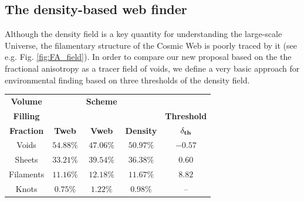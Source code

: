 \documentclass[a4,useAMS,usenatbib,usegraphicx]{latex/mn2e}
\begin{document}
\subsection{The density-based web finder}
\label{subsec:Vweb}


Although the density field is a key quantity for understanding the 
large-scale Universe, the filamentary structure of the Cosmic Web is 
poorly traced by it (see e.g. Fig. \ref{fig:FA_field}). In order to 
compare our new proposal based on the the fractional anisotropy as a 
tracer field of voids, we define a very basic approach for environmental 
finding based on three thresholds of the density field. 


\begin{table}[h]
\begin{flushleft}
\begin{center}
  \begin{tabular}{c  c  c  c c} \hline\hline
	\textbf{Volume}  &				&\textbf{Scheme}& \\
	\textbf{Filling} &				&				&					  &  \textbf{Threshold} \\ 
	\textbf{Fraction}&\textbf{Tweb}&\textbf{Vweb}	&	\textbf{Density}  &  $\bf{\delta_{th}}$  \\ \hline
	Voids			 &	$54.88\%$	&	$47.06\%$	&	$50.97\%$	 	  &	$ -0.57$			\\ 
	Sheets		     &	$33.21\%$	&	$39.54\%$	&	$36.38\%$ 	      &	$0.60$				\\
	Filaments		 &	$11.16\%$	&	$12.18\%$	&	$11.67\%$ 		  &	$8.82$				\\
	Knots			 &	$0.75\%$	&	$1.22\%$	&	$0.98\%$  		  &	--		\\ \hline\hline
  \end{tabular}  
  
  \label{tab:VFF}
\end{center}
\end{flushleft}
\end{table}
\end{document}
